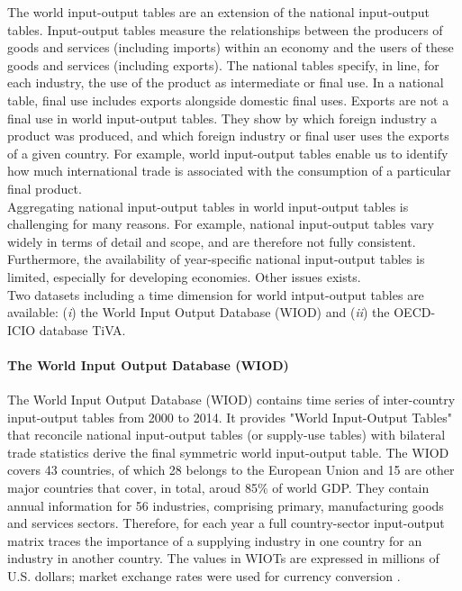 \documentclass[11pt,a4paper]{article}
\begin{document}
The world input-output tables are an extension of the national input-output tables. Input-output tables measure the relationships between the producers of goods and services (including imports) within an economy and the users of these goods and services (including exports). The national tables specify, in line, for each industry, the use of the product as intermediate or final use. In a national table, final use includes exports alongside domestic final uses. Exports are not a final use in world input-output tables. They show by which foreign industry a product was produced, and which foreign industry or final user uses the exports of a given country. For example, world input-output tables enable us to identify how much international trade is associated with the consumption of a particular final product. \\
Aggregating national input-output tables in world input-output tables is challenging for many reasons. For example, national input-output tables vary widely in terms of detail and scope, and are therefore not fully consistent. Furthermore, the availability of year-specific national input-output tables is limited, especially for developing economies. Other issues exists. \\
Two datasets including a time dimension for world intput-output tables are available: (\textit{i}) the World Input Output Database (WIOD) and (\textit{ii}) the OECD-ICIO database TiVA.
\paragraph{The World Input Output Database (WIOD)}
The World Input Output Database (WIOD) contains time series of inter-country input-output tables from 2000 to 2014.  It provides "World Input-Output Tables" that reconcile national input-output tables (or supply-use tables) with bilateral trade statistics derive the final symmetric world input-output table. The WIOD covers 43 countries, of which 28 belongs to the European Union and 15 are other major countries that cover, in total, aroud 85$\%$ of world GDP. They contain annual information for 56 industries, comprising primary, manufacturing goods and services sectors. Therefore, for each year a full country-sector input-output matrix traces the importance of a supplying industry in one country for an industry in another country. The values in WIOTs are expressed in millions of U.S. dollars; market exchange rates were used for currency conversion \citep{Timmer2015}. 

\end{document}
